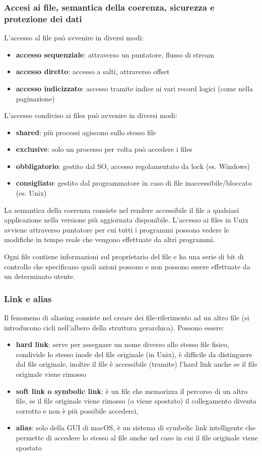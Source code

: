 \documentclass[a4paper]{article}
\begin{document}
\subsubsection*{Accesi ai file, semantica della coerenza, sicurezza e protezione dei dati}
L'accesso al file può avvenire in diversi modi:
\begin{itemize}
	\item \textbf{accesso sequenziale}: attraverso un puntatore, flusso di stream
	\item \textbf{accesso diretto}: accesso a salti, attraverso offset
	\item \textbf{accesso indicizzato}: accesso tramite indice ai vari record logici (come nella paginazione)
\end{itemize}
L'accesso condiviso ai files può avvenire in diversi modi:
\begin{itemize}
	\item \textbf{shared}: più processi agiscono sullo stesso file
	\item \textbf{exclusive}: solo un processo per volta può accedere i files
	\item \textbf{obbligatorio}: gestito dal SO, accesso regolamentato da lock (es. Windows)
	\item \textbf{consigliato}: gestito dal programmatore in caso di file inaccessibile/bloccato (es. Unix)
\end{itemize}
La semantica della coerenza consiste nel rendere accessibile il file a qualsiasi applicazione nella versione più aggiornata
disponibile. L'accesso ai files in Unix avviene attraverso puntatore per cui tutti i programmi possono vedere le modifiche in
tempo reale che vengono effettuate da altri programmi.

Ogni file contiene informazioni sul proprietario del file e ha una serie di bit di controllo che specificano quali azioni
possono e non possono essere effettuate da un determinato utente.

\subsubsection*{Link e alias}
Il fenomeno di aliasing consiste nel creare dei file-riferimento ad un altro file (si introducono cicli nell'albero della
struttura gerarchica). Possono essere:
\begin{itemize}
	\item \textbf{hard link}: serve per assegnare un nome diverso allo stesso file fisico, condivide lo stesso inode del file
	originale (in Unix), è difficile da distinguere dal file originale, inoltre il file è accessibile (tramite) l'hard link
	anche se il file originale viene rimosso
	\item \textbf{soft link o symbolic link}: è un file che memorizza il percorso di un altro file, se il file originale viene
	rimosso (o viene spostato) il collegamento diventa corrotto e non è più possibile accederci, 
	\item \textbf{alias}: solo della GUI di macOS, è un sistema di symbolic link intelligente che permette di accedere lo stesso
	al file anche nel caso in cui il file originale viene spostato
\end{itemize}
\end{document}

